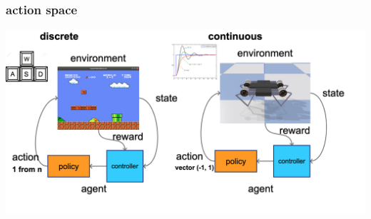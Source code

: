 \documentclass{beamer}
\begin{document}
\begin{frame}

  \frametitle{action space} 
  \includegraphics[scale=0.15]{../diagrams/basic/actionspace.png}
  
\end{frame}
\end{document}
